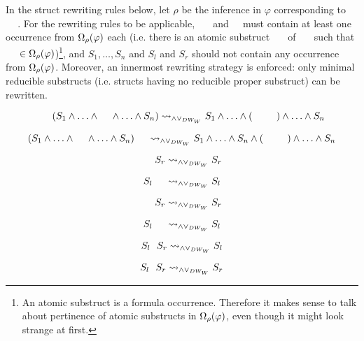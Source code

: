 \begin{definition}[$\normalizePlusTimesDW$]
\label{definition:NormalizationPlusTimesDefinitionalSwap}

In the struct rewriting rules below, let $\rho$ be the inference in $\varphi$ corresponding to $\hF{\structtimes_{\rho}}$. For the rewriting rules to be applicable, $\hF{S_k}$ and $\hF{S}$ must contain at least one occurrence from $\Omega_{\rho}(\varphi)$ each (i.e. there is an atomic substruct $\hF{S'_{k}}$ of $\hF{S_{k}}$ such that $\hF{S'_{k}} \in \occInference{\varphi}{\rho}$)\footnote{
An atomic substruct is a formula occurrence. Therefore it makes sense to talk about pertinence of atomic substructs in $\Omega_{\rho}(\varphi)$, even though it might look strange at first.}, and $S_1, \ldots, S_n$ and $S_l$ and $S_r$ should not contain any occurrence from $\Omega_{\rho}(\varphi)$. Moreover, an innermost rewriting strategy is enforced: only minimal reducible substructs (i.e. structs having no reducible proper substruct) can be rewritten.

$$
\hF{S} \hF{\structtimes} (S_1 \structplus \ldots \structplus \hF{S_k} \structplus \ldots \structplus S_n) \normalizePlusTimesDWw  S_1 \structplus \ldots \structplus (\hF{S} \hF{\structtimes} \hF{S_{k}}) \structplus \ldots \structplus S_n
$$

$$
(S_1 \structplus \ldots \structplus \hF{S_k} \structplus \ldots \structplus S_n) \hF{\structtimes} \hF{S} \normalizePlusTimesDWw  S_1 \structplus \ldots \structplus S_n \structplus ( \hF{S_k} \hF{\structtimes} \hF{S}) \structplus \ldots \structplus S_n  
$$

\begin{multicols}{4}{

$$
\hF{S} \hF{\structtimes} S_r \normalizePlusTimesDWw  S_r
$$

$$
S_l \hF{\structtimes} \hF{S} \normalizePlusTimesDWw  S_l
$$

$$
\hF{S} \hF{\structplus} S_r \normalizePlusTimesDWw  S_r
$$

$$
S_l \hF{\structplus} \hF{S} \normalizePlusTimesDWw  S_l
$$

}\end{multicols}


\begin{multicols}{4}{

$$
S_l \hF{\structtimes} S_r \normalizePlusTimesDWw  S_l
$$

$$
S_l \hF{\structtimes} S_r \normalizePlusTimesDWw  S_r
$$

}
\end{multicols}
\end{definition}
